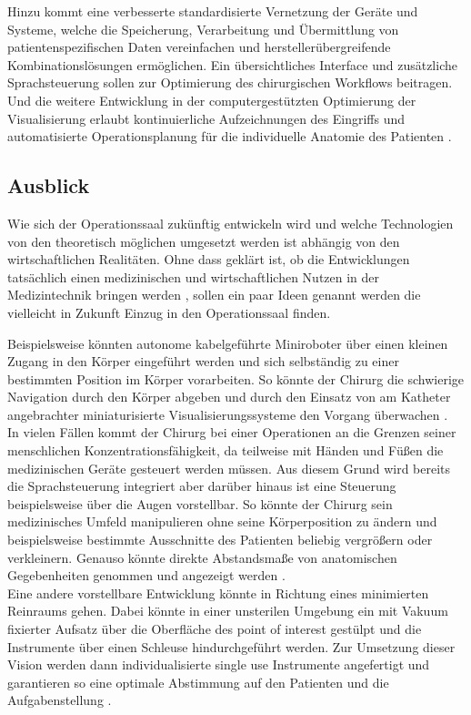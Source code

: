 Hinzu kommt eine verbesserte standardisierte Vernetzung der Geräte und Systeme, welche die Speicherung, Verarbeitung und Übermittlung von patientenspezifischen Daten vereinfachen und herstellerübergreifende Kombinationslösungen ermöglichen. Ein übersichtliches Interface und zusätzliche Sprachsteuerung sollen zur Optimierung des chirurgischen Workflows beitragen. Und die weitere Entwicklung in der computergestützten Optimierung der Visualisierung erlaubt kontinuierliche Aufzeichnungen des Eingriffs \cite{DerDigitaleOperationssaal} und automatisierte Operationsplanung für die individuelle Anatomie des Patienten \cite{CurrentAndFuture}. 

\subsection{Ausblick}
Wie sich der Operationssaal zukünftig entwickeln wird und welche Technologien von den theoretisch möglichen umgesetzt werden ist abhängig von den wirtschaftlichen Realitäten. Ohne dass geklärt ist, ob die Entwicklungen tatsächlich einen medizinischen und wirtschaftlichen Nutzen in der Medizintechnik bringen werden \cite{DerDigitaleOperationssaal}, sollen ein paar Ideen genannt werden die vielleicht in Zukunft Einzug in den Operationssaal finden.

Beispielsweise könnten autonome kabelgeführte Miniroboter über einen kleinen Zugang in den Körper eingeführt werden und sich selbständig zu einer bestimmten Position im Körper vorarbeiten. So könnte der Chirurg die schwierige Navigation durch den Körper abgeben und durch den Einsatz von am Katheter angebrachter miniaturisierte Visualisierungssysteme den Vorgang überwachen \cite{DerDigitaleOperationssaal}.\\
In vielen Fällen kommt der Chirurg bei einer Operationen an die Grenzen seiner menschlichen Konzentrationsfähigkeit, da teilweise mit Händen und Füßen die medizinischen Geräte gesteuert werden müssen. Aus diesem Grund wird bereits die Sprachsteuerung integriert aber darüber hinaus ist eine Steuerung beispielsweise über die Augen vorstellbar. So könnte der Chirurg sein medizinisches Umfeld manipulieren ohne seine Körperposition zu ändern und beispielsweise bestimmte Ausschnitte des Patienten beliebig vergrößern oder verkleinern. Genauso könnte direkte Abstandsmaße von anatomischen Gegebenheiten genommen und angezeigt werden \cite{DerDigitaleOperationssaal}. \\
Eine andere vorstellbare Entwicklung könnte in Richtung eines minimierten Reinraums gehen. Dabei könnte in einer unsterilen Umgebung ein mit Vakuum fixierter Aufsatz über die Oberfläche des \glqq point of interest\grqq{} gestülpt und die Instrumente über einen Schleuse hindurchgeführt werden. Zur Umsetzung dieser Vision werden dann individualisierte \glqq single use\grqq{} Instrumente angefertigt und garantieren so eine optimale Abstimmung auf den Patienten und die Aufgabenstellung \cite{DerDigitaleOperationssaal}.

